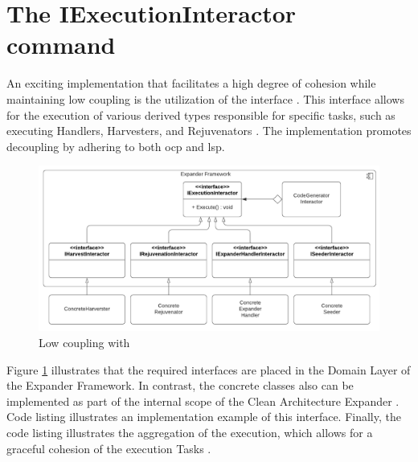 \section{The IExecutionInteractor command} \label{subsec_IExecutionInteractorObject}

An exciting implementation that facilitates a high degree of cohesion while maintaining
low coupling is the utilization of the  interface
\parencite{koks_iexecutioninteractor_2023}. This interface allows for the execution of
various derived types responsible for specific tasks, such as executing Handlers,
Harvesters, and Rejuvenators \parencites{koks_expandentitieshandlerinteractor_2023,
koks_regionharvesterinteractor_2023, koks_regionrejuvenatorinteractor_2023}. The
implementation promotes decoupling by adhering to both \gls{ocp} and \gls{lsp}.

\begin{figure}[H]
    \centering
    \includegraphics[width=1\textwidth]{figures/command_pattern.pdf}
    \caption[Low coupling with ]{Low coupling with }
    \label{fig_iexecutioninteractor}
  \end{figure}


Figure \ref{fig_iexecutioninteractor} illustrates that the required interfaces are placed
in the Domain Layer of the Expander Framework. In contrast, the concrete classes also can
be implemented as part of the internal scope of the Clean Architecture Expander
\parencite{koks_migrationharvesterinteractor_2023}. Code listing
 illustrates an implementation example of
this interface. Finally, the code listing 
illustrates the aggregation of the execution, which allows for a graceful cohesion of the
execution Tasks \parencite{koks_codegeneratorinteractor_2023}.
